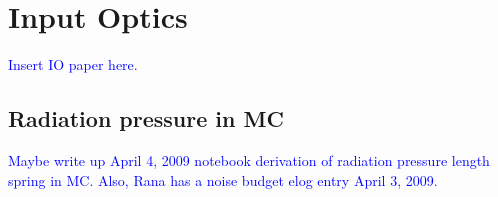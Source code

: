 \chapter{Input Optics}

\textcolor{blue}{Insert IO paper here.}

\section{Radiation pressure in MC}
\textcolor{blue}{Maybe write up April 4, 2009 notebook derivation of
  radiation pressure length spring in MC. Also, Rana has a noise
  budget elog entry April 3, 2009.}
